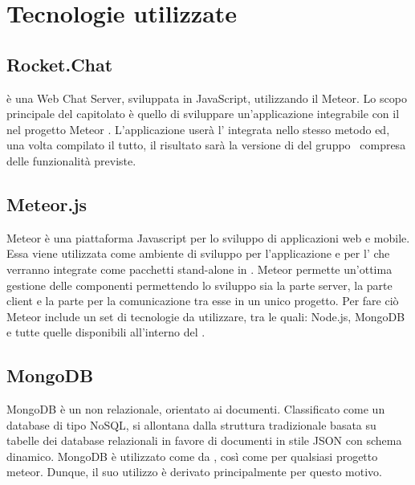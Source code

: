 \section{Tecnologie utilizzate}

\subsection{Rocket.Chat}
 è una Web Chat Server, sviluppata in JavaScript, utilizzando il  Meteor. Lo scopo principale del capitolato è quello di sviluppare un'applicazione integrabile con il   nel progetto Meteor . L'applicazione userà l' integrata nello stesso metodo ed, una volta compilato il tutto, il risultato sarà la versione di  del gruppo \gruppo\ compresa delle funzionalità previste.

\subsection{Meteor.js}
Meteor è una piattaforma Javascript per lo sviluppo di applicazioni web e mobile. Essa viene utilizzata come ambiente di sviluppo per l'applicazione e per l' che verranno integrate come pacchetti stand-alone in .
Meteor permette un'ottima gestione delle componenti permettendo lo sviluppo sia la parte server, la parte client e la parte per la comunicazione tra esse in un unico progetto. Per fare ciò Meteor include un set di tecnologie da utilizzare, tra le quali: Node.js, MongoDB e tutte quelle disponibili all'interno del  .

\subsection{MongoDB}
MongoDB è un  non relazionale, orientato ai documenti. Classificato come un database di tipo NoSQL, si allontana dalla
struttura tradizionale basata su tabelle dei database relazionali in favore di documenti in stile
JSON con schema dinamico. MongoDB è utilizzato come  da , così come per qualsiasi progetto meteor. Dunque, il suo utilizzo è derivato principalmente per questo motivo.

